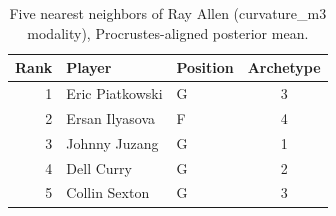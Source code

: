 \begin{table}[htbp]
  \centering\small
  \begin{tabular}{rllc}
    \toprule
    Rank & Player & Position & Archetype \\
    \midrule
    1 & Eric Piatkowski & G & 3 \\
    2 & Ersan Ilyasova & F & 4 \\
    3 & Johnny Juzang & G & 1 \\
    4 & Dell Curry & G & 2 \\
    5 & Collin Sexton & G & 3 \\
    \bottomrule
  \end{tabular}
  \caption{Five nearest neighbors of Ray Allen (curvature_m3 modality), Procrustes-aligned posterior mean.}
  \label{tab:Ray_Allen_neighbors_curvature_m3}
\end{table}

